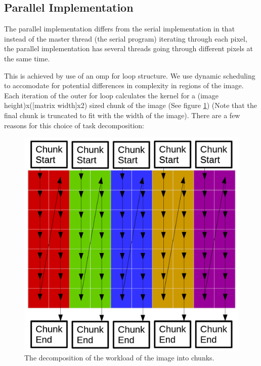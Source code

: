\documentclass[paper=a4, fontsize=11pt]{scrartcl} %
\numberwithin{equation}{section} %
\numberwithin{figure}{section} %
\numberwithin{table}{section} %
\begin{document}
\subsection{Parallel Implementation}
The parallel implementation differs from the serial implementation in that instead of the master thread (the serial program) iterating through each pixel, the parallel implementation has several threads going through different pixels at the same time.

This is achieved by use of an omp for loop structure. We use dynamic scheduling to accomodate for potential differences in complexity in regions of the image. Each iteration of the outer for loop calculates the kernel for a (image height)x([matrix width]x2) sized chunk of the image (See figure \ref{chunks}) (Note that the final chunk is truncated to fit with the width of the image).  There are a few reasons for this choice of task decomposition:

\begin{figure}[H]
	\centering
	\includegraphics[scale=0.25]{"Chunks"}
	\caption{The decomposition of the workload of the image into chunks.}
        \label{chunks}
\end{figure}
\end{document}
